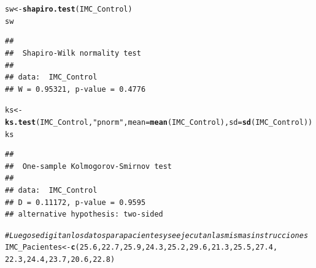 \documentclass{article}\usepackage[]{graphicx}\usepackage[]{color}
\makeatletter
\newcommand{\hlnum}[1]{\textcolor[rgb]{0.686,0.059,0.569}{#1}}%
\newcommand{\hlstr}[1]{\textcolor[rgb]{0.192,0.494,0.8}{#1}}%
\newcommand{\hlcom}[1]{\textcolor[rgb]{0.678,0.584,0.686}{\textit{#1}}}%
\newcommand{\hlstd}[1]{\textcolor[rgb]{0.345,0.345,0.345}{#1}}%
\newcommand{\hlkwb}[1]{\textcolor[rgb]{0.69,0.353,0.396}{#1}}%
\newcommand{\hlkwc}[1]{\textcolor[rgb]{0.333,0.667,0.333}{#1}}%
\newcommand{\hlkwd}[1]{\textcolor[rgb]{0.737,0.353,0.396}{\textbf{#1}}}%
\newenvironment{kframe}{%
 \def\at@end@of@kframe{}%
 \ifinner\ifhmode%
  \def\at@end@of@kframe{\end{minipage}}%
  \begin{minipage}{\columnwidth}%
 \fi\fi%
 \def\FrameCommand##1{\hskip\@totalleftmargin \hskip-\fboxsep
 \colorbox{shadecolor}{##1}\hskip-\fboxsep
     \hskip-\linewidth \hskip-\@totalleftmargin \hskip\columnwidth}%
 \MakeFramed {\advance\hsize-\width
   \@totalleftmargin\z@ \linewidth\hsize
   \@setminipage}}%
 {\par\unskip\endMakeFramed%
 \at@end@of@kframe}
\newenvironment{knitrout}{}{} %
\makeatother
\begin{document}
\begin{knitrout}
\begin{kframe}\begin{alltt}
\hlstd{sw} \hlkwb{<-} \hlkwd{shapiro.test}\hlstd{(IMC_Control)}
\hlstd{sw}
\end{alltt}
\begin{verbatim}
## 
## 	Shapiro-Wilk normality test
## 
## data:  IMC_Control
## W = 0.95321, p-value = 0.4776
\end{verbatim}
\begin{alltt}
\hlstd{ks} \hlkwb{<-} \hlkwd{ks.test}\hlstd{(IMC_Control,}\hlstr{"pnorm"}\hlstd{,}\hlkwc{mean}\hlstd{=}\hlkwd{mean}\hlstd{(IMC_Control),}\hlkwc{sd}\hlstd{=}\hlkwd{sd}\hlstd{(IMC_Control))}
\hlstd{ks}
\end{alltt}
\begin{verbatim}
## 
## 	One-sample Kolmogorov-Smirnov test
## 
## data:  IMC_Control
## D = 0.11172, p-value = 0.9595
## alternative hypothesis: two-sided
\end{verbatim}
\begin{alltt}
\hlcom{#Luego se digitan los datos para pacientes y se ejecutan las mismas instrucciones}
\hlstd{IMC_Pacientes} \hlkwb{<-} \hlkwd{c}\hlstd{(}\hlnum{25.6}\hlstd{,} \hlnum{22.7}\hlstd{,} \hlnum{25.9}\hlstd{,} \hlnum{24.3}\hlstd{,} \hlnum{25.2}\hlstd{,} \hlnum{29.6}\hlstd{,} \hlnum{21.3}\hlstd{,} \hlnum{25.5}\hlstd{,} \hlnum{27.4}\hlstd{,}
                   \hlnum{22.3}\hlstd{,} \hlnum{24.4}\hlstd{,} \hlnum{23.7}\hlstd{,} \hlnum{20.6}\hlstd{,} \hlnum{22.8}\hlstd{)}


\end{alltt}
\end{kframe}
\end{knitrout}
\end{document}

